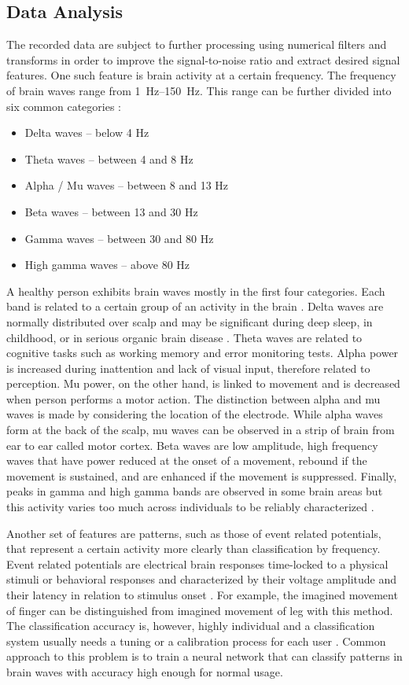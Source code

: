 \subsection{Data Analysis} \label{sub:dataAnalysis}
The recorded data are subject to further processing using numerical filters and
transforms in order to improve the signal-to-noise ratio and extract desired signal features. 
One such feature is brain activity at a certain frequency. The frequency of brain
waves range from \SIrange{1}{150}{\Hz}. This range can be further divided
into six common categories \cite{dominantF}:
\begin{itemize}
  \item Delta waves -- below 4 Hz
  \item Theta waves -- between 4 and 8 Hz
  \item Alpha / Mu waves -- between 8 and 13 Hz
  \item Beta waves -- between 13 and 30 Hz
  \item Gamma waves -- between 30 and 80 Hz
  \item High gamma waves -- above 80 Hz
\end{itemize}
A healthy person exhibits brain waves mostly in the first four categories. Each
band is related to a certain group of an activity in the brain \cite{dominantF}. Delta waves are normally
distributed over scalp and may be significant during deep sleep, in childhood, or
in serious organic brain disease \cite{eegClass}. Theta waves are related to
cognitive tasks such as working memory and error monitoring tests. Alpha power
is increased during inattention and lack of visual input, therefore related to
perception. Mu power, on the other hand, is linked to movement and is decreased
when person performs a motor action. The distinction between alpha and mu waves
is made by considering the location of the electrode. While alpha waves form at the
back of the scalp, mu waves can be observed in a strip of brain from ear to ear
called motor cortex. Beta waves are low amplitude, high frequency waves
that have power reduced at the onset of a movement, rebound if the movement is
sustained, and are enhanced if the movement is suppressed. Finally, peaks in gamma and high gamma bands are observed in some brain areas but this activity varies too much across individuals to be reliably characterized \cite{dominantF}.

Another set of features are patterns, such as those of event related potentials, that represent a certain activity more clearly than classification by frequency. Event related potentials are electrical brain responses time-locked to a physical stimuli or behavioral responses and characterized by their voltage amplitude and their latency in relation to stimulus onset \cite{bcComm}. For example, the imagined movement of
finger can be distinguished from imagined movement of leg with this method. The
classification accuracy is, however, highly individual and a classification
system usually needs a tuning or a calibration process for each user \cite{bcComm}.
Common approach to this problem is to train a neural network that can classify
patterns in brain waves with accuracy high enough for normal usage.

